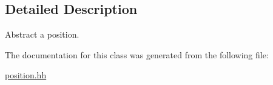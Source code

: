 \subsection{Detailed Description}
Abstract a position. 

The documentation for this class was generated from the following file\-:\begin{DoxyCompactItemize}
\item 
\hyperlink{position_8hh}{position.\-hh}\end{DoxyCompactItemize}
